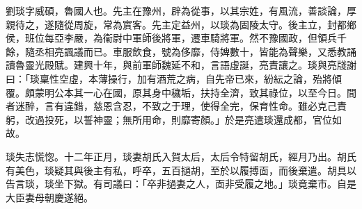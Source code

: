 
\begin{pinyinscope}
劉琰字威碩，魯國人也。先主在豫州，辟為從事，以其宗姓，有風流，善談論，厚親待之，遂隨從周旋，常為賔客。先主定益州，以琰為固陵太守。後主立，封都鄉侯，班位每亞李嚴，為衞尉中軍師後將軍，遷車騎將軍。然不豫國政，但領兵千餘，隨丞相亮諷議而已。車服飲食，號為侈靡，侍婢數十，皆能為聲樂，又悉教誦讀魯靈光殿賦。建興十年，與前軍師魏延不和，言語虛誕，亮責讓之。琰與亮牋謝曰：「琰稟性空虛，本薄操行，加有酒荒之病，自先帝已來，紛紜之論，殆將傾覆。頗蒙明公本其一心在國，原其身中穢垢，扶持全濟，致其祿位，以至今日。間者迷醉，言有違錯，慈恩含忍，不致之于理，使得全完，保育性命。雖必克己責躬，改過投死，以誓神靈；無所用命，則靡寄顏。」於是亮遣琰還成都，官位如故。

琰失志慌惚。十二年正月，琰妻胡氏入賀太后，太后令特留胡氏，經月乃出。胡氏有美色，琰疑其與後主有私，呼卒，五百撾胡，至於以履搏靣，而後棄遣。胡具以告言琰，琰坐下獄。有司議曰：「卒非撾妻之人，靣非受履之地。」琰竟棄市。自是大臣妻母朝慶遂絕。


\end{pinyinscope}
